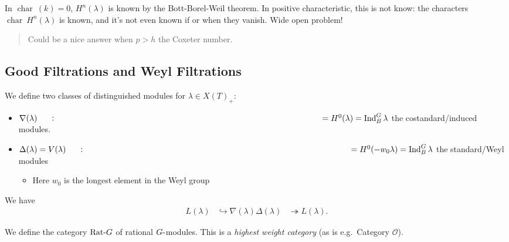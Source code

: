 \begin{remark}

\begin{remark}

In \(\operatorname{char}~(k) = 0\), \(H^n(\lambda)\) is known by the
Bott-Borel-Weil theorem. In positive characteristic, this is not know:
the characters \(\operatorname{char}~H^n (\lambda)\) is known, and it's
not even known if or when they vanish. Wide open problem!

\begin{quote}
Could be a nice answer when \(p>h\) the Coxeter number.
\end{quote}

\end{remark}

\end{remark}

\hypertarget{good-filtrations-and-weyl-filtrations}{%
\subsection{Good Filtrations and Weyl
Filtrations}\label{good-filtrations-and-weyl-filtrations}}

We define two classes of distinguished modules for
\(\lambda \in X(T)_+\):

\begin{itemize}
\tightlist
\item
  \(\nabla(\lambda) \mathrel{\vcenter{:}}= H^0(\lambda) = \operatorname{Ind}_B^G \lambda\)
  the costandard/induced modules.
\item
  \(\Delta(\lambda) = V(\lambda) \mathrel{\vcenter{:}}= H^0(-w_0 \lambda) = \operatorname{Ind}_B^G \lambda\)
  the standard/Weyl modules

  \begin{itemize}
  \tightlist
  \item
    Here \(w_0\) is the longest element in the Weyl group
  \end{itemize}
\end{itemize}

We have
\begin{align*}   L(\lambda) &\hookrightarrow\nabla(\lambda) \Delta(\lambda) &\twoheadrightarrow L(\lambda) .\end{align*}

We define the category \(\text{Rat}{\hbox{-}}G\) of rational
\(G{\hbox{-}}\)modules. This is a \emph{highest weight category} (as is
e.g.~Category \({\mathcal{O}}\)).

